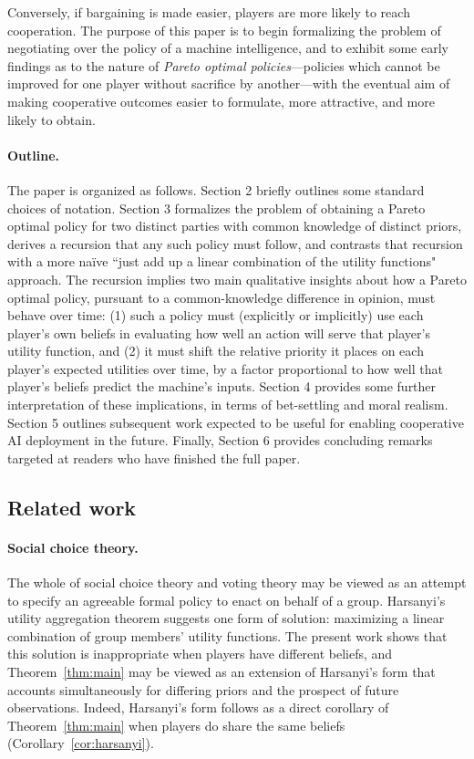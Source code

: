 \documentclass{article}  %
\newcommand{\thm}[1]{Theorem~\ref{thm:#1}}
\newcommand{\cor}[1]{Corollary~\ref{cor:#1}}
\begin{document}
Conversely, if bargaining is made easier, players are more likely to reach cooperation.  The purpose of this paper is to begin formalizing the problem of negotiating over the policy of a machine intelligence, and to exhibit some early findings as to the nature of \emph{Pareto optimal policies}---policies which cannot be improved for one player without sacrifice by another---with the eventual aim of making cooperative outcomes easier to formulate, more attractive, and more likely to obtain.

\paragraph{Outline.} The paper is organized as follows.  Section 2 briefly outlines some standard choices of notation.  Section 3 formalizes the problem of obtaining a Pareto optimal policy for two distinct parties with common knowledge of distinct priors, derives a recursion that any such policy must follow, and contrasts that recursion with a more na\"{i}ve ``just add up a linear combination of the utility functions" approach.  The recursion implies two main qualitative insights about how a Pareto optimal policy, pursuant to a common-knowledge difference in opinion, must behave over time: (1) such a policy must (explicitly or implicitly) use each player's own beliefs in evaluating how well an action will serve that player's utility function, and (2) it must shift the relative priority it places on each player's expected utilities over time, by a factor proportional to how well that player's beliefs predict the machine's inputs.  Section 4 provides some further interpretation of these implications, in terms of bet-settling and moral realism.  Section 5 outlines subsequent work expected to be useful for enabling cooperative AI deployment in the future.  Finally, Section 6 provides concluding remarks targeted at readers who have finished the full paper.

\subsection{Related work}

\paragraph{Social choice theory.} The whole of social choice theory and voting theory may be viewed as an attempt to specify an agreeable formal policy to enact on behalf of a group.  Harsanyi's utility aggregation theorem \citep{harsanyi1980cardinal} suggests one form of solution: maximizing a linear combination of group members' utility functions.  The present work shows that this solution is inappropriate when players have different beliefs, and \thm{main} may be viewed as an extension of Harsanyi's form that accounts simultaneously for differing priors and the prospect of future observations.  Indeed, Harsanyi's form follows as a direct corollary of \thm{main} when players do share the same beliefs (\cor{harsanyi}).
\end{document}

